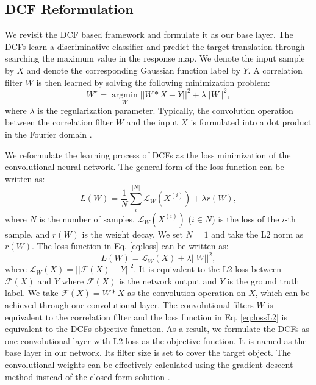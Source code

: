 \documentclass[10pt,twocolumn,letterpaper]{article}
\begin{document}
\subsection{DCF Reformulation}\label{sec:base}
We revisit the DCF based framework and formulate it as our base layer.
The DCFs learn a discriminative classifier and predict the target translation through searching the maximum value in the response map. We denote the input sample by $X$ and denote the corresponding Gaussian function label by $Y$. A correlation filter $W$ is then learned by solving the following minimization problem:
\begin{equation}
W^\star=\mathop{\arg\min}\limits_{W}||W\ast X-Y||^2+\lambda||W||^2,
\label{eq:dcf}
\end{equation}
where $\lambda$ is the regularization parameter. Typically, the convolution operation between the correlation filter $W$ and the input $X$ is formulated into a dot product in the Fourier domain \cite{Henriques-eccv12-DCF,ma-cvpr15-lct,henriques-pami15-high}.

We reformulate the learning process of DCFs as the loss minimization of the convolutional neural network. The general form of the loss function \cite{jia-arxiv14-caffe} can be written as:
\begin{equation}
L(W)=\frac{1}{N}\sum_i^{|N|}\mathcal{L}_W(X^{(i)})+\lambda r(W),
\label{eq:loss}
\end{equation}
where $N$ is the number of samples, $\mathcal{L}_W(X^{(i)})$ ($i\in N$) is the loss of the $i$-th sample, and $r(W)$ is the weight decay. We set $N=1$ and take the L2 norm as $r(W)$. The loss function in Eq. \ref{eq:loss} can be written as:
\begin{equation}
L(W)=\mathcal{L}_W(X)+\lambda||W||^2,
\label{eq:lossL2}
\end{equation}
where $\mathcal{L}_W(X)=||\mathcal{F}(X)-Y||^2$. It is equivalent to the L2 loss between $\mathcal{F}(X)$ and $Y$ where $\mathcal{F}(X)$ is the network output and $Y$ is the ground truth label. We take $\mathcal{F}(X)=W\ast X$ as the convolution operation on $X$, which can be achieved through one convolutional layer. The convolutional filters $W$ is equivalent to the correlation filter and the loss function in Eq. \ref{eq:lossL2} is equivalent to the DCFs objective function. As a result, we formulate the DCFs as one convolutional layer with L2 loss as the objective function. It is named as the base layer in our network. Its filter size is set to cover the target object. The convolutional weights can be effectively calculated using the gradient descent method instead of the closed form solution \cite{henriques-pami15-high}.
\end{document}
